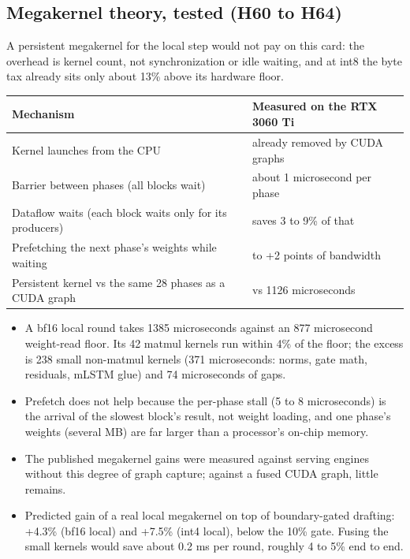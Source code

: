 \documentclass[11pt,a4paper]{article}
\begin{document}
\subsection{Megakernel theory, tested (H60 to H64)}\label{megakernel-theory-tested-h60-to-h64}

A persistent megakernel for the local step would not pay on this card: the overhead is kernel count, not synchronization or idle waiting, and at int8 the byte tax already sits only about 13\% above its hardware floor.

\begin{center}\small\setlength{\tabcolsep}{4pt}
\begin{tabular}{@{}>{\raggedright\arraybackslash}p{}>{\raggedright\arraybackslash}p{}@{}}
\toprule
\textbf{Mechanism} & \textbf{Measured on the RTX 3060 Ti} \\
\midrule
Kernel launches from the CPU & already removed by CUDA graphs \\
Barrier between phases (all blocks wait) & about 1 microsecond per phase \\
Dataflow waits (each block waits only for its producers) & saves 3 to 9\% of that \\
Prefetching the next phase's weights while waiting & -1 to +2 points of bandwidth \\
Persistent kernel vs the same 28 phases as a CUDA graph & 1123 vs 1126 microseconds \\
\bottomrule
\end{tabular}
\end{center}

\begin{itemize}
\item
  A bf16 local round takes 1385 microseconds against an 877 microsecond weight-read floor. Its 42 matmul kernels run within 4\% of the floor; the excess is 238 small non-matmul kernels (371 microseconds: norms, gate math, residuals, mLSTM glue) and 74 microseconds of gaps.
\item
  Prefetch does not help because the per-phase stall (5 to 8 microseconds) is the arrival of the slowest block's result, not weight loading, and one phase's weights (several MB) are far larger than a processor's on-chip memory.
\item
  The published megakernel gains \citep{hazy2025megakernel,cheng2026mpk} were measured against serving engines without this degree of graph capture; against a fused CUDA graph, little remains.
\item
  Predicted gain of a real local megakernel on top of boundary-gated drafting: +4.3\% (bf16 local) and +7.5\% (int4 local), below the 10\% gate. Fusing the small kernels would save about 0.2 ms per round, roughly 4 to 5\% end to end.
\end{itemize}
\end{document}
